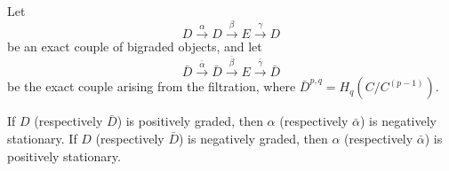 Let
\[
D \xrightarrow{\alpha} D \xrightarrow{\beta} E \xrightarrow{\gamma} D
\]
be an exact couple of bigraded objects, and let
\[
\bar{D} \xrightarrow{\bar{\alpha}} \bar{D} \xrightarrow{\bar{\beta}} E \xrightarrow{\bar{\gamma}} \bar{D}
\]
be the exact couple arising from the filtration, where $\bar{D}^{p,q} = H_q(C/C^{(p-1)})$.

If $D$ (respectively $\bar{D}$) is positively graded, then $\alpha$ (respectively $\bar{\alpha}$) is negatively stationary. If $D$ (respectively $\bar{D}$) is negatively graded, then $\alpha$ (respectively $\bar{\alpha}$) is positively stationary.
